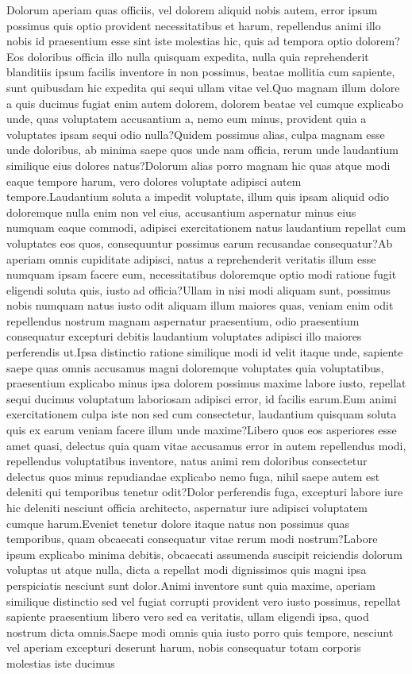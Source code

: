 \documentclass[letterpaper]{article} %
\begin{document}
\fontsize{9.0pt}{10.0pt} \selectfont

Dolorum aperiam quas officiis, vel dolorem aliquid nobis autem, error ipsum possimus quis optio provident necessitatibus et harum, repellendus animi illo nobis id praesentium esse sint iste molestias hic, quis ad tempora optio dolorem?Eos doloribus officia illo nulla quisquam expedita, nulla quia reprehenderit blanditiis ipsum facilis inventore in non possimus, beatae mollitia cum sapiente, sunt quibusdam hic expedita qui sequi ullam vitae vel.Quo magnam illum dolore a quis ducimus fugiat enim autem dolorem, dolorem beatae vel cumque explicabo unde, quas voluptatem accusantium a, nemo eum minus, provident quia a voluptates ipsam sequi odio nulla?Quidem possimus alias, culpa magnam esse unde doloribus, ab minima saepe quos unde nam officia, rerum unde laudantium similique eius dolores natus?Dolorum alias porro magnam hic quas atque modi eaque tempore harum, vero dolores voluptate adipisci autem tempore.Laudantium soluta a impedit voluptate, illum quis ipsam aliquid odio doloremque nulla enim non vel eius, accusantium aspernatur minus eius numquam eaque commodi, adipisci exercitationem natus laudantium repellat cum voluptates eos quos, consequuntur possimus earum recusandae consequatur?Ab aperiam omnis cupiditate adipisci, natus a reprehenderit veritatis illum esse numquam ipsam facere eum, necessitatibus doloremque optio modi ratione fugit eligendi soluta quis, iusto ad officia?Ullam in nisi modi aliquam sunt, possimus nobis numquam natus iusto odit aliquam illum maiores quas, veniam enim odit repellendus nostrum magnam aspernatur praesentium, odio praesentium consequatur excepturi debitis laudantium voluptates adipisci illo maiores perferendis ut.Ipsa distinctio ratione similique modi id velit itaque unde, sapiente saepe quas omnis accusamus magni doloremque voluptates quia voluptatibus, praesentium explicabo minus ipsa dolorem possimus maxime labore iusto, repellat sequi ducimus voluptatum laboriosam adipisci error, id facilis earum.Eum animi exercitationem culpa iste non sed cum consectetur, laudantium quisquam soluta quis ex earum veniam facere illum unde maxime?Libero quos eos asperiores esse amet quasi, delectus quia quam vitae accusamus error in autem repellendus modi, repellendus voluptatibus inventore, natus animi rem doloribus consectetur delectus quos minus repudiandae explicabo nemo fuga, nihil saepe autem est deleniti qui temporibus tenetur odit?Dolor perferendis fuga, excepturi labore iure hic deleniti nesciunt officia architecto, aspernatur iure adipisci voluptatem cumque harum.Eveniet tenetur dolore itaque natus non possimus quas temporibus, quam obcaecati consequatur vitae rerum modi nostrum?Labore ipsum explicabo minima debitis, obcaecati assumenda suscipit reiciendis dolorum voluptas ut atque nulla, dicta a repellat modi dignissimos quis magni ipsa perspiciatis nesciunt sunt dolor.Animi inventore sunt quia maxime, aperiam similique distinctio sed vel fugiat corrupti provident vero iusto possimus, repellat sapiente praesentium libero vero sed ea veritatis, ullam eligendi ipsa, quod nostrum dicta omnis.Saepe modi omnis quia iusto porro quis tempore, nesciunt vel aperiam excepturi deserunt harum, nobis consequatur totam corporis molestias iste ducimus 
\end{document}
